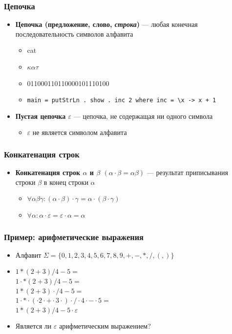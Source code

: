 \documentclass{beamer}
\begin{document}
\begin{frame}[fragile]
  \transwipe[direction=90]
  \frametitle{Цепочка}
  \begin{itemize}
    \item \textbf{Цепочка (предложение, слово, \emph{строка})} --- любая конечная
последовательность символов алфавита
    \begin{itemize}
      \item cat
      \item $\kappa \alpha \tau$
      \item 011000110110000101110100
      \item \verb!main = putStrLn . show . inc 2 where inc = \x -> x + 1!
    \end{itemize}
    \item \textbf{Пустая цепочка $\varepsilon$} --- цепочка, не содержащая ни одного символа
    \begin{itemize}
      \item $\varepsilon$ не является символом алфавита
    \end{itemize}
  \end{itemize}
\end{frame}

\begin{frame}[fragile]
  \transwipe[direction=90]
  \frametitle{Конкатенация строк}
  \begin{itemize}
    \item \textbf{Конкатенация строк $\alpha$ и $\beta$ $(\alpha \cdot \beta = \alpha \beta)$} --- результат
приписывания строки $\beta$ в конец строки $\alpha$
    \begin{itemize}
      \item $\forall \alpha \beta \gamma : (\alpha \cdot \beta) \cdot \gamma = \alpha \cdot (\beta \cdot \gamma)$
      \item $\forall \alpha : \alpha \cdot \varepsilon = \varepsilon \cdot \alpha = \alpha$
    \end{itemize}
  \end{itemize}
\end{frame}

\begin{frame}[fragile]
  \transwipe[direction=90]
  \frametitle{Пример: арифметические выражения}
  \begin{itemize}
    \item Алфавит $\Sigma = \{ 0, 1, 2, 3, 4, 5, 6, 7, 8, 9, +, -, *, /, (, ) \}$
    \item $1 * (2 + 3) / 4 - 5 =$ \\ $ 1 \cdot * (2 + 3) / 4 - 5 =$ \\ $ 1 * (2 + 3) \cdot / 4 - 5 = $\\ $ 1 \cdot * \cdot (\cdot 2 \cdot + \cdot 3 \cdot) \cdot / \cdot 4 \cdot - \cdot 5 = $ \\ $ 1 * (2 + 3) / 4 - 5 \cdot \varepsilon$
    \item Является ли $\varepsilon$ арифметическим выражением?
  \end{itemize}
\end{frame}
\end{document}
